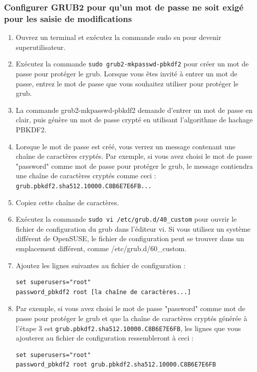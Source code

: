 \documentclass[12pt,a4paper]{article}
\newcommand{\code}[1]{\colorbox{light-gray}{\texttt{#1}}}
\begin{document}
        \subsubsection{Configurer GRUB2 pour qu'un mot de passe ne soit exigé pour les saisie de modifications} 
        \begin{enumerate}
            \item Ouvrez un terminal et exécutez la commande sudo su pour devenir superutilisateur.
            \item Exécutez la commande \code{sudo grub2-mkpasswd-pbkdf2} pour créer un mot de passe pour protéger le grub. Lorsque vous êtes invité à entrer un mot de passe, entrez le mot de passe que vous souhaitez utiliser pour protéger le grub.
            \item La commande grub2-mkpasswd-pbkdf2 demande d'entrer un mot de passe en clair, puis génère un mot de passe crypté en utilisant l'algorithme de hachage PBKDF2.
            \item Lorsque le mot de passe est créé, vous verrez un message contenant une chaîne de caractères cryptés. Par exemple, si vous avez choisi le mot de passe "password" comme mot de passe pour protéger le grub, le message contiendra une chaîne de caractères cryptés comme ceci : \code{grub.pbkdf2.sha512.10000.C8B6E7E6FB...}
            \item Copiez cette chaîne de caractères.
            \item Exécutez la commande \code{sudo vi /etc/grub.d/40\_custom} pour ouvrir le fichier de configuration du grub dans l'éditeur vi. Si vous utilisez un système différent de OpenSUSE, le fichier de configuration peut se trouver dans un emplacement différent, comme /etc/grub.d/60\_custom.
            \item Ajoutez les lignes suivantes au fichier de configuration :
            \begin{lstlisting}
set superusers="root"
password_pbkdf2 root [la chaîne de caractères...]
            \end{lstlisting}
            \item Par exemple, si vous avez choisi le mot de passe "password" comme mot de passe pour protéger le grub et que la chaîne de caractères cryptés générée à l'étape 3 est \code{grub.pbkdf2.sha512.10000.C8B6E7E6FB}, les lignes que vous ajouterez au fichier de configuration ressembleront à ceci :
            \begin{lstlisting}
set superusers="root"
password_pbkdf2 root grub.pbkdf2.sha512.10000.C8B6E7E6FB

\end{lstlisting}
\end{enumerate}
\end{document}
